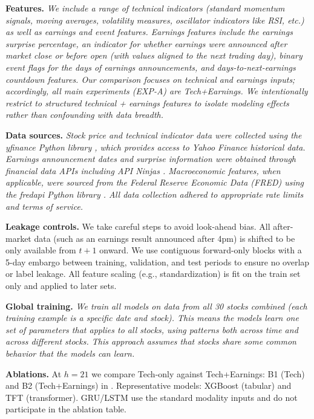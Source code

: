\documentclass[conference,a4paper]{IEEEtran}
\newcommand{\simp}[1]{{\itshape #1}}
\begin{document}
    	\textbf{Features.} \simp{We include a range of technical indicators (standard momentum signals, moving averages, volatility measures, oscillator indicators like RSI, etc.) as well as earnings and event features. Earnings features include the earnings surprise percentage, an indicator for whether earnings were announced after market close or before open (with values aligned to the next trading day), binary event flags for the days of earnings announcements, and days-to-next-earnings countdown features. Our comparison focuses on technical and earnings inputs; accordingly, all main experiments (EXP-A) are Tech+Earnings. We intentionally restrict to structured technical + earnings features to isolate modeling effects rather than confounding with data breadth.}

    	\textbf{Data sources.} \simp{Stock price and technical indicator data were collected using the yfinance Python library \citep{yfinance2022}, which provides access to Yahoo Finance historical data. Earnings announcement dates and surprise information were obtained through financial data APIs including API Ninjas \citep{ninjas2024api}. Macroeconomic features, when applicable, were sourced from the Federal Reserve Economic Data (FRED) using the fredapi Python library \citep{mortada2023fredapi}. All data collection adhered to appropriate rate limits and terms of service.}

    	\textbf{Leakage controls.} We take careful steps to avoid look-ahead bias. All after-market data (such as an earnings result announced after 4pm) is shifted to be only available from $t+1$ onward. We use contiguous forward-only blocks with a 5-day embargo between training, validation, and test periods to ensure no overlap or label leakage. All feature scaling (e.g., standardization) is fit on the train set only and applied to later sets.

        \textbf{Global training.} \simp{We train all models on data from all 30 stocks combined (each training example is a specific date and stock). This means the models learn one set of parameters that applies to all stocks, using patterns both across time and across different stocks. This approach assumes that stocks share some common behavior that the models can learn.}

    	\textbf{Ablations.} At $h{=}21$ we compare Tech-only against Tech+Earnings: B1 (Tech) and B2 (Tech+Earnings) in . Representative models: XGBoost (tabular) and TFT (transformer). GRU/LSTM use the standard modality inputs and do not participate in the ablation table.
\end{document}
